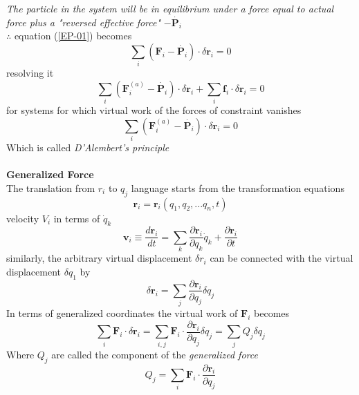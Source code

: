 \textit{The particle in the system will be in equilibrium under a force equal to actual force plus a "reversed effective force"} $-\dot{\textbf{P}_i}$\\
$\therefore$ equation (\ref{EP-01}) becomes
\begin{equation}
\sum\limits_{i}(\textbf{F}_i-\dot{\textbf{P}_i})\cdot\delta \textbf{r}_i=0 \label{EP-05}
\end{equation}
resolving it
$$\sum\limits_{i}(\textbf{F}_i^{(a)}-\dot{\textbf{P}_i})\cdot\delta \textbf{r}_i+\sum\limits_{i}\textbf{f}_i\cdot\delta \textbf{r}_i=0$$
for systems for which virtual work of the forces of constraint vanishes
\begin{equation}
\sum\limits_{i}(\textbf{F}_i^{(a)}-\dot{\textbf{P}_i})\cdot\delta\label{EP-06} \textbf{r}_i=0
\end{equation}
Which is called \textit{D'Alembert's principle}\\\\
\textbf{Generalized Force}\\
The translation from $r_i$ to $q_j$ language starts from the transformation equations
\begin{equation}
\textbf{r}_i=\textbf{r}_i(q_1,q_2,...q_n,t)\label{EP-07}
\end{equation}
velocity $V_i$ in terms of $\dot{q}_k$
\begin{equation}
\mathbf{v}_{i} \equiv \frac{d \mathbf{r}_{i}}{d t}=\sum_{k} \frac{\partial \mathbf{r}_{i}}{\partial q_{k}} \dot{q}_{k}+\frac{\partial \mathbf{r}_{i}}{\partial t}\label{EP-08}
\end{equation}
similarly, the arbitrary virtual displacement $\delta r_i$ can be connected with the virtual displacement $\delta q_1$ by
\begin{equation}
\delta \mathbf{r}_{i}=\sum_{j} \frac{\partial \mathbf{r}_{i}}{\partial q_{j}} \delta q_{j}
\end{equation}
In terms of generalized coordinates the virtual work of $\textbf{F}_i$ becomes
\begin{equation}
\sum_{i} \mathbf{F}_{i} \cdot \delta \mathbf{r}_{i}=\sum_{i, j} \mathbf{F}_{i} \cdot \frac{\partial \mathbf{r}_{i}}{\partial q_{j}} \delta q_{j}=\sum_{j} Q_{j} \delta q_{j}\label{EP-10}
\end{equation}
Where $Q_j$ are called the component of the \textit{generalized force} 
\begin{equation}
Q_{j}=\sum_{i} \mathbf{F}_{i} \cdot \frac{\partial \mathbf{r}_{i}}{\partial q_{j}}\label{EP-11}
\end{equation}
